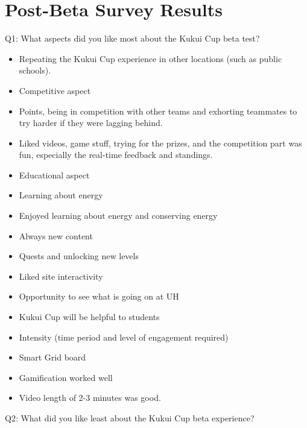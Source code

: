 \chapter{Post-Beta Survey Results}
\label{appendix:beta-survey}

Q1: What aspects did you like most about the Kukui Cup beta test?

\begin{itemize}
  \item Repeating the Kukui Cup experience in other locations (such as public schools).
  \item Competitive aspect
  \item Points, being in competition with other teams and exhorting teammates to try harder if they were lagging behind.
  \item Liked videos, game stuff, trying for the prizes, and the competition part was fun, especially the real-time feedback and standings.
  \item Educational aspect
  \item Learning about energy
  \item Enjoyed learning about energy and conserving energy
  \item Always new content
  \item Quests and unlocking new levels
  \item Liked site interactivity
  \item Opportunity to see what is going on at UH
  \item Kukui Cup will be helpful to students
  \item Intensity (time period and level of engagement required)
  \item Smart Grid board
  \item Gamification worked well
  \item Video length of 2-3 minutes was good.
\end{itemize}

Q2: What did you like least about the Kukui Cup beta experience?

